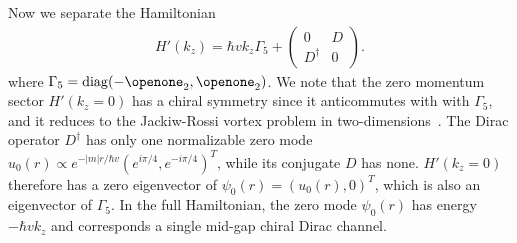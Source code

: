 Now we separate the Hamiltonian \begin{align}H'(k_z)=\hbar vk_z\Gamma_5+\left(\begin{smallmatrix}0&D\\D^\dagger&0\end{smallmatrix}\right).\end{align} where $\Gamma_5=\mathrm{diag}(-\openone_2,\openone_2)$. We note that the zero momentum sector $H'(k_z=0)$ has a chiral symmetry since it anticommutes with with $\Gamma_5$, and it reduces to the Jackiw-Rossi vortex problem in two-dimensions~\cite{JackiwRossi81}. The Dirac operator $D^\dagger$ has only one normalizable zero mode $u_0(r)\propto e^{-|m|r/\hbar v}(e^{i\pi/4}, e^{-i\pi/4})^T$, while its conjugate $D$ has none. $H'(k_z=0)$ therefore has a zero eigenvector of $\psi_0(r)=(u_0(r),0)^T$, which is also an eigenvector of $\Gamma_5$. In the full Hamiltonian, the zero mode $\psi_0(r)$ has energy $-\hbar vk_z$ and corresponds a single mid-gap chiral Dirac channel.

